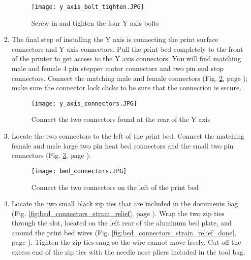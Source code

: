 \begin{enumerate}
\begin{figure}[H]
\centering
\texttt{[image: y\_axis\_bolt\_tighten.JPG]}
\caption{Screw in and tighten the four Y axis bolts}
\label{fig:Y_axis_bolts_tighten}
\end{figure}

\item The final step of installing the Y axis is connecting the print surface connectors and Y axis connectors. Pull the print bed completely to the front of the printer to get access to the Y axis connectors. You will find matching male and female 4 pin stepper motor connectors and two pin end stop connectors. Connect the matching male and female connectors (Fig. \ref{fig:Y_axis_connectors}, page \pageref{fig:Y_axis_connectors}); make sure the connector lock clicks to be sure that the connection is secure.


\begin{figure}[p]
\centering
\texttt{[image: y\_axis\_connectors.JPG]}
\caption{Connect the two connectors found at the rear of the Y axis}
\label{fig:Y_axis_connectors}
\end{figure}

\item Locate the two connectors to the left of the print bed. Connect the matching female and male large two pin heat bed connectors and the small two pin connectors (Fig. \ref{fig:bed_connectors}, page \pageref{fig:bed_connectors}).

\begin{figure}[p]
\centering
\texttt{[image: bed\_connectors.JPG]}
\caption{Connect the two connectors on the left of the print bed}
\label{fig:bed_connectors}
\end{figure}

\item Locate the two small black zip ties that are included in the documents bag (Fig. \ref{fig:bed_connectors_strain_relief}, page \pageref{fig:bed_connectors_strain_relief}). Wrap the two zip ties through the slot, located on the left rear of the aluminum bed plate, and around the print bed wires (Fig. \ref{fig:bed_connectors_strain_relief_done}, page \pageref{fig:bed_connectors_strain_relief_done}). Tighten the zip ties snug so the wire cannot move freely. Cut off the excess end of the zip ties with the needle nose pliers included in the tool bag.


\end{enumerate}
